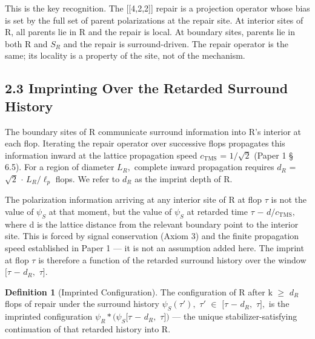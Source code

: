 \documentclass[11pt,oneside]{report}
\theoremstyle{definition}
\newtheorem{definition}[theorem]{Definition}
\theoremstyle{remark}
\begin{document}
This is the key recognition. The [[4,2,2]] repair is a
projection operator whose bias is set by the full set of parent
polarizations at the repair site. At interior sites of R, all parents
lie in R and the repair is local. At boundary sites, parents lie in both
R and \ensuremath{S_{R}} and the repair is surround-driven. The repair operator is the
same; its locality is a property of the site, not of the mechanism.

\subsection*{2.3 Imprinting Over the Retarded Surround History}

The boundary sites of R communicate surround information into R's
interior at each flop. Iterating the repair operator over successive
flops propagates this information inward at the lattice propagation
speed \ensuremath{c_{\mathrm{TMS}}} = \ensuremath{1/\sqrt{2}} (Paper 1 \S\,6.5). For a region of diameter \ensuremath{L_{R},}
complete inward propagation requires \ensuremath{d_{R}} = \ensuremath{\sqrt{2}} \ensuremath{\cdot} \ensuremath{L_{R}/\ell_{p}} flops. We refer
to \ensuremath{d_{R}} as the imprint depth of R.

The polarization information arriving at any interior site of R at flop
\ensuremath{\tau} is not the value of \ensuremath{\psi_{S}} at that moment, but the value of \ensuremath{\psi_{S}} at
retarded time \ensuremath{\tau} \ensuremath{-} \ensuremath{d/c_{\mathrm{TMS}},} where d is the lattice distance from the
relevant boundary point to the interior site. This is forced by signal
conservation (Axiom 3) and the finite propagation speed established in
Paper 1 --- it is not an assumption added here. The imprint at flop \ensuremath{\tau} is
therefore a function of the retarded surround history over the window
\ensuremath{[\tau} \ensuremath{-} \ensuremath{d_{R},} \ensuremath{\tau ].}

\begin{definition}[Imprinted Configuration]
The configuration of R after k \ensuremath{\geq}
\ensuremath{d_{R}} flops of repair under the surround history \ensuremath{\psi_{S}(\tau '),} \ensuremath{\tau '} \ensuremath{\in} \ensuremath{[\tau} \ensuremath{-}
\ensuremath{d_{R},} \ensuremath{\tau ],} is the imprinted configuration \ensuremath{\psi_{R}*(\psi_{S}}\textbar\ensuremath{[\tau} \ensuremath{-}
\ensuremath{d_{R},} \ensuremath{\tau ])} --- the unique stabilizer-satisfying continuation of that
retarded history into R.
\end{definition}
\end{document}
